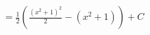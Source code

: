 \documentclass[preview]{standalone}
\begin{document}
\begin{align*}
= \frac{1}{2} \left( \frac{(x^2 + 1)^2}{2} - (x^2 + 1) \right) + C
\end{align*}
\end{document}
